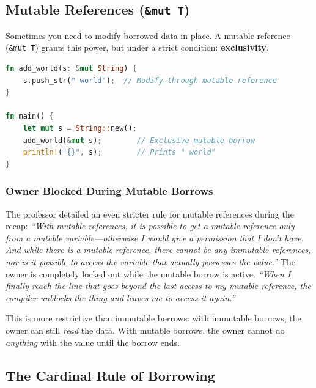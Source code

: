 \subsection{Mutable References (\texttt{\&mut T})}

Sometimes you need to modify borrowed data in place. A mutable reference (\texttt{\&mut T}) grants this power, but under a strict condition: \textbf{exclusivity}.

\begin{lstlisting}[language=Rust]
fn add_world(s: &mut String) {
    s.push_str(" world");  // Modify through mutable reference
}

fn main() {
    let mut s = String::new();
    add_world(&mut s);        // Exclusive mutable borrow
    println!("{}", s);        // Prints " world"
}
\end{lstlisting}

\subsubsection{Owner Blocked During Mutable Borrows}

The professor detailed an even stricter rule for mutable references during the recap: \emph{``With mutable references, it is possible to get a mutable reference only from a mutable variable---otherwise I would give a permission that I don't have. And while there is a mutable reference, there cannot be any immutable references, nor is it possible to access the variable that actually possesses the value.''} The owner is completely locked out while the mutable borrow is active. \emph{``When I finally reach the line that goes beyond the last access to my mutable reference, the compiler unblocks the thing and leaves me to access it again.''}

This is more restrictive than immutable borrows: with immutable borrows, the owner can still \emph{read} the data. With mutable borrows, the owner cannot do \emph{anything} with the value until the borrow ends.

\subsection{The Cardinal Rule of Borrowing}

